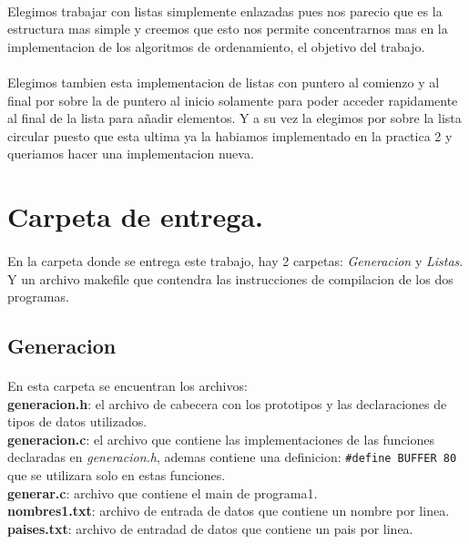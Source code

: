 \documentclass{article}
\begin{document}
	\paragraph{} 
	Elegimos trabajar con listas simplemente enlazadas pues nos parecio que es la estructura mas simple y creemos que esto nos permite concentrarnos mas en la implementacion de los algoritmos de ordenamiento, el objetivo del trabajo.
	\paragraph{}
	Elegimos tambien esta implementacion de listas con puntero al comienzo y al final por sobre la de puntero al inicio solamente para poder acceder rapidamente al final de la lista para añadir elementos. Y a su vez la elegimos por sobre la lista circular puesto que esta ultima ya la habiamos implementado en la practica 2 y queriamos hacer una implementacion nueva.
	
	\pagebreak
	
	\section{Carpeta de entrega.}
	\paragraph{}
	En la carpeta donde se entrega este trabajo, hay 2 carpetas: \emph{Generacion} y \emph{Listas}. Y un archivo makefile que contendra las instrucciones de compilacion de los dos programas.
	
	\subsection{Generacion}
	\paragraph{}
	En esta carpeta se encuentran los archivos: \\ 
	\textbf{generacion.h}: el archivo de cabecera con los prototipos y las declaraciones de tipos de datos utilizados. \\
	\textbf{generacion.c}: el archivo que contiene las implementaciones de las funciones declaradas en \emph{generacion.h}, ademas contiene una definicion: \lstinline|#define BUFFER 80| que se utilizara solo en estas funciones. \\
	\textbf{generar.c}: archivo que contiene el main de programa1. \\
	\textbf{nombres1.txt}: archivo de entrada de datos que contiene un nombre por linea.\\
	\textbf{paises.txt}: archivo de entradad de datos que contiene un pais por linea. 
\end{document}
